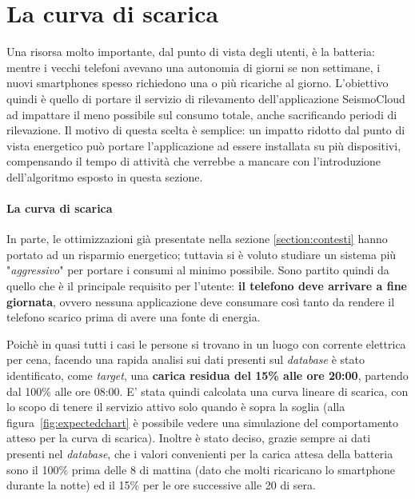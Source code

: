 \documentclass[a4paper,10pt]{memoir}
\begin{document}
\section{La curva di scarica}
\label{section:curvascarica}

Una risorsa molto importante, dal punto di vista degli utenti, è la batteria: mentre i vecchi telefoni avevano una autonomia di giorni se non settimane, i nuovi smartphones spesso richiedono una o più ricariche al giorno. L'obiettivo quindi è quello di portare il servizio di rilevamento dell'applicazione SeismoCloud ad impattare il meno possibile sul consumo totale, anche sacrificando periodi di rilevazione. Il motivo di questa scelta è semplice: un impatto ridotto dal punto di vista energetico può portare l'applicazione ad essere installata su più dispositivi, compensando il tempo di attività che verrebbe a mancare con l'introduzione dell'algoritmo esposto in questa sezione.

\paragraph{La curva di scarica} In parte, le ottimizzazioni già presentate nella sezione \ref{section:contesti} hanno portato ad un risparmio energetico; tuttavia si è voluto studiare un sistema più "\textit{aggressivo}" per portare i consumi al minimo possibile. Sono partito quindi da quello che è il principale requisito per l'utente: \textbf{il telefono deve arrivare a fine giornata}, ovvero nessuna applicazione deve consumare così tanto da rendere il telefono scarico prima di avere una fonte di energia.

Poichè in quasi tutti i casi le persone si trovano in un luogo con corrente elettrica per cena, facendo una rapida analisi sui dati presenti sul \textit{database} è stato identificato, come \textit{target}, una \textbf{carica residua del 15\% alle ore 20:00}, partendo dal 100\% alle ore 08:00. E' stata quindi calcolata una curva lineare di scarica, con lo scopo di tenere il servizio attivo solo quando è sopra la soglia (alla figura~\ref{fig:expectedchart} è possibile vedere una simulazione del comportamento atteso per la curva di scarica). Inoltre è stato deciso, grazie sempre ai dati presenti nel \textit{database}, che i valori convenienti per la carica attesa della batteria sono il 100\% prima delle 8 di mattina (dato che molti ricaricano lo smartphone durante la notte) ed il 15\% per le ore successive alle 20 di sera.

\pagebreak
\end{document}
